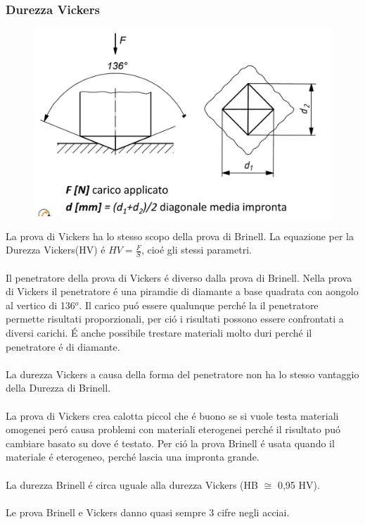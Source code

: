\documentclass{article}
\begin{document}
{                \subsubsection{Durezza Vickers}
                    \begin{figure}[!h]
                        \centering
                        \includegraphics[width=.85\linewidth]{Diagramma per la Prova Vickers.png}
                    \end{figure}
                    La prova di Vickers ha lo stesso scopo della prova di Brinell.
                    La equazione per la Durezza Vickers(HV) \'e $HV = \frac{F}{S}$, cio\'e gli stessi parametri.\\ \\
                    Il penetratore della prova di Vickers \'e diverso dalla prova di Brinell. Nella prova di Vickers il penetratore \'e una piramdie di diamante a base quadrata con aongolo al vertico di 136$^o$. Il carico pu\'o essere qualunque perch\'e la il penetratore permette risultati proporzionali, per ci\'o i risultati possono essere confrontati a diversi carichi. \'E anche possibile trestare materiali molto duri perch\'e il penetratore \'e di diamante.\\ \\
                    La durezza Vickers a causa della forma del penetratore non ha lo stesso vantaggio della Durezza di Brinell.\\ \\
                    La prova di Vickers crea calotta piccol che \'e buono se si vuole testa materiali omogenei per\'o causa problemi con materiali eterogenei perch\'e il risultato pu\'o cambiare basato su dove \'e testato. Per ci\'o la prova Brinell \'e usata quando il materiale \'e eterogeneo, perch\'e lascia una impronta grande.\\ \\
                    La durezza Brinell \'e circa uguale alla durezza Vickers (HB $\cong$ 0,95 HV). \\ \\
                    Le prova Brinell e Vickers danno quasi sempre 3 cifre negli acciai.
}
\end{document}

